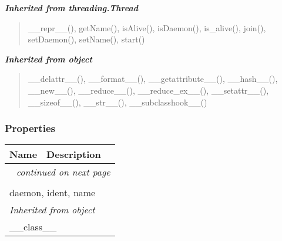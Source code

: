 \large{\textbf{\textit{Inherited from threading.Thread}}}

\begin{quote}
\_\_repr\_\_(), getName(), isAlive(), isDaemon(), is\_alive(), join(), setDaemon(), setName(), start()
\end{quote}

\large{\textbf{\textit{Inherited from object}}}

\begin{quote}
\_\_delattr\_\_(), \_\_format\_\_(), \_\_getattribute\_\_(), \_\_hash\_\_(), \_\_new\_\_(), \_\_reduce\_\_(), \_\_reduce\_ex\_\_(), \_\_setattr\_\_(), \_\_sizeof\_\_(), \_\_str\_\_(), \_\_subclasshook\_\_()
\end{quote}


  \subsubsection{Properties}

    \vspace{-1cm}
\hspace{\varindent}\begin{longtable}{|p{\varnamewidth}|p{\vardescrwidth}|l}
\cline{1-2}
\cline{1-2} \centering \textbf{Name} & \centering \textbf{Description}& \\
\cline{1-2}
\endhead\cline{1-2}\multicolumn{3}{r}{\small\textit{continued on next page}}\\\endfoot\cline{1-2}
\endlastfoot\multicolumn{2}{|l|}{\textit{Inherited from threading.Thread}}\\
\multicolumn{2}{|p{\varwidth}|}{\raggedright daemon, ident, name}\\
\cline{1-2}
\multicolumn{2}{|l|}{\textit{Inherited from object}}\\
\multicolumn{2}{|p{\varwidth}|}{\raggedright \_\_class\_\_}\\
\cline{1-2}
\end{longtable}

